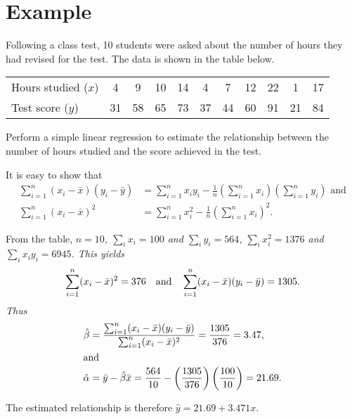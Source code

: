 \section{Example}
\begin{example}
Following a class test, 10 students were asked about the number of hours they had revised for the test. The data is shown in the table below.
\begin{center}
\begin{tabular}{|l|cccccccccc|} \hline
Hours studied ($x$)	&  4	 &  9 & 10 & 14 &  4 &  7 & 12 & 22 &  1 & 17 \\ 
Test score ($y$)		& 31 & 58 & 65 & 73 & 37 & 44 & 60 & 91 & 21 & 84 \\ \hline
\end{tabular}
\end{center}
Perform a simple linear regression to estimate the relationship between the number of hours studied and the score achieved in the test.

\end{example}
\begin{solution}
It is easy to show that 
\begin{align*}
\sum_{i=1}^n (x_i - \bar{x})(y_i - \bar{y})	
		& = \sum_{i=1}^n x_iy_i - \frac{1}{n}\left(\sum_{i=1}^n x_i\right)\left(\sum_{i=1}^n y_i\right) \text{ and} \\
\sum_{i=1}^n (x_i - \bar{x})^2				
		& = \sum_{i=1}^n x_i^2 - \frac{1}{n}\left(\sum_{i=1}^n x_i\right)^2.
\end{align*}



From the table,
\bit
\it $n=10$,
\it $\sum_i x_i = 100$ and $\sum_i y_i = 564$,
\it $\sum_i x_i^2 = 1376$ and $\sum_i x_iy_i = 6945$.
\eit
This yields
\[
\sum_{i=1}^n(x_i-\bar{x})^2  = 376 \text{\quad and\quad} \sum_{i=1}^n (x_i - \bar{x})(y_i - \bar{y}) = 1305.
\]
Thus
\begin{align*}
\hat{\beta}	
	& = \displaystyle\frac{\sum_{i=1}^n (x_i - \bar{x})(y_i - \bar{y})}{\sum_{i=1}^n(x_i-\bar{x})^2} 
	= \displaystyle\frac{1305}{376}	= 3.47,\\	
\intertext{and}
\hat{\alpha}
	& = \displaystyle\bar{y} - \hat{\beta}\bar{x} 
	= \displaystyle\frac{564}{10} - \left(\frac{1305}{376}\right)\left(\frac{100}{10}\right) = 21.69.
\end{align*}

\vspace*{2ex}
The estimated relationship is therefore $\hat{y} = 21.69 + 3.471 x$.
\end{solution}


